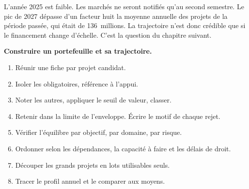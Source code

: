 L'année 2025 est faible. Les marchés ne seront notifiés qu'au second semestre. Le pic de 2027 dépasse d'un
facteur huit la moyenne annuelle des projets de la période passée, qui était de 136~millions. La trajectoire
n'est donc crédible que si le financement change d'échelle. C'est la question du chapitre suivant.

\begin{boxprocedure}
\textbf{Construire un portefeuille et sa trajectoire.}
\begin{enumerate}
    \item Réunir une fiche par projet candidat.
    \item Isoler les obligatoires, référence à l'appui.
    \item Noter les autres, appliquer le seuil de valeur, classer.
    \item Retenir dans la limite de l'enveloppe. Écrire le motif de chaque rejet.
    \item Vérifier l'équilibre par objectif, par domaine, par risque.
    \item Ordonner selon les dépendances, la capacité à faire et les délais de droit.
    \item Découper les grands projets en lots utilisables seuls.
    \item Tracer le profil annuel et le comparer aux moyens.
\end{enumerate}
\end{boxprocedure}

